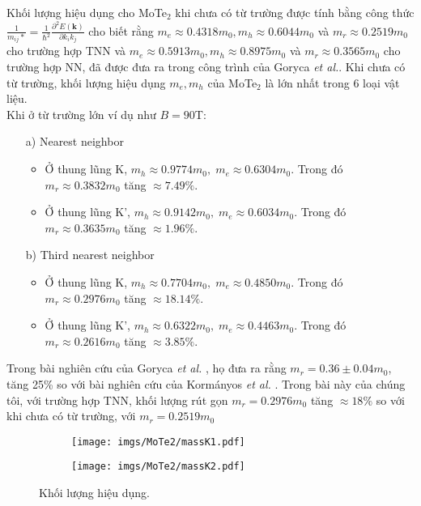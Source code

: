 \documentclass{article}
\begin{document}
Khối lượng hiệu dụng cho MoTe$_{2}$ khi chưa có từ trường được tính bằng công thức $\frac{1}{m_{ij}*} =\frac{1}{\hbar^{2}} \frac{\partial^{2} E(\mathbf{k})}{\partial k_{i} k_{j}}$ cho biết rằng $m_{e} \approx 0.4318 m_{0}, m_{h} \approx 0.6044 m_{0}$ và $m_{r} \approx 0.2519 m_{0}$ cho trường hợp TNN và $m_{e} \approx 0.5913 m_{0}, m_{h} \approx 0.8975 m_{0}$ và $m_{r} \approx 0.3565 m_{0}$ cho trường hợp NN, đã được đưa ra trong công trình của Goryca \textit{et al.}\cite{goryca2019}. Khi chưa có từ trường, khối lượng hiệu dụng $m_{e}, m_{h}$ của MoTe$_{2}$ là lớn nhất trong 6 loại vật liệu. \\
Khi ở từ trường lớn ví dụ như $B = 90 $T:
\begin{itemize}
	\item[a)] Nearest neighbor
	\begin{itemize}
		\item Ở thung lũng K, $m_{h} \approx 0.9774 m_{0},\; m_{e} \approx 0.6304 m_{0}$. 
		Trong đó $m_{r} \approx 0.3832 m_{0}$ tăng $\approx 7.49\%$.
		
		\item Ở thung lũng K', $m_{h} \approx 0.9142 m_{0},\; m_{e} \approx 0.6034 m_{0}$. 
		Trong đó $m_{r} \approx 0.3635 m_{0}$ tăng $\approx 1.96\%$.
	\end{itemize}
	\item[b)] Third nearest neighbor
	\begin{itemize}
		\item Ở thung lũng K, $m_{h} \approx 0.7704 m_{0},\; m_{e} \approx 0.4850 m_{0}$. 
		Trong đó $m_{r} \approx 0.2976 m_{0}$ tăng $\approx 18.14\%$.
		
		\item Ở thung lũng K', $m_{h} \approx 0.6322 m_{0},\; m_{e} \approx 0.4463 m_{0}$. 
		Trong đó $m_{r} \approx 0.2616 m_{0}$ tăng $\approx 3.85\%$.
	\end{itemize}
\end{itemize}
Trong bài nghiên cứu của Goryca \textit{et al.} \cite{goryca2019}, họ đưa ra rằng $m_{r} = 0.36 \pm 0.04 m_{0}$, tăng 25\% so với bài nghiên cứu của Korm\'{a}nyos \textit{et al.} \cite{kormanyos2015}. Trong bài này của chúng tôi, với trường hợp TNN, khối lượng rút gọn $m_{r} = 0.2976 m_{0}$ tăng $\approx 18\%$ so với khi chưa có từ trường, với $m_{r} = 0.2519 m_{0}$
\begin{figure}[htb]
	\begin{subfigure}{0.495\textwidth}
		\centering
		\texttt{[image: imgs/MoTe2/massK1.pdf]}
	\end{subfigure}
	\begin{subfigure}{0.495\textwidth}
		\centering
		\texttt{[image: imgs/MoTe2/massK2.pdf]}
	\end{subfigure}
	\caption{Khối lượng hiệu dụng.}
\end{figure}
\end{document}

